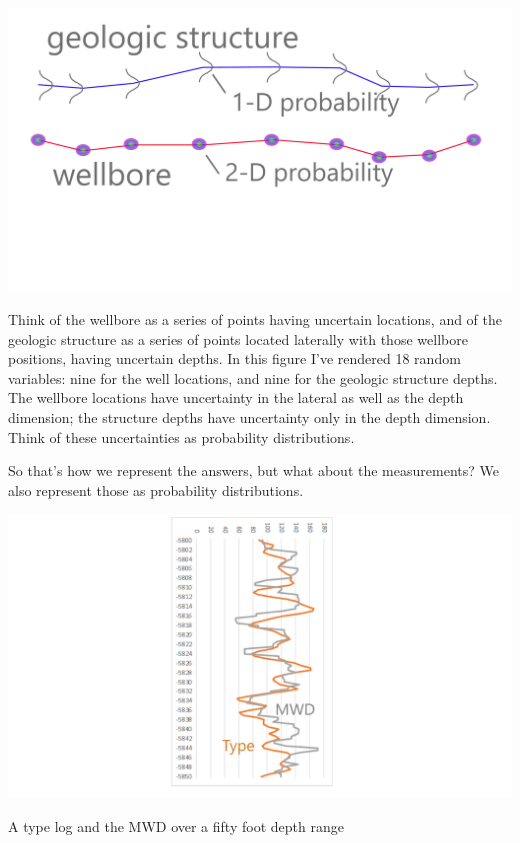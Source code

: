 \documentclass{tufte-handout}
\begin{document}
\begin{marginfigure}
  \includegraphics{random-vars-lateral}
  \caption{Think of the wellbore as a series of points having 
  uncertain locations, and of the geologic structure as a series
  of points located laterally with those wellbore positions, having uncertain depths. In this figure I've rendered 18 random variables: nine for the well locations, and nine for the geologic structure depths. The wellbore locations have uncertainty in the lateral as well as the depth dimension; the structure depths have uncertainty only in the depth dimension. Think of these uncertainties as probability distributions.}
  \label{fig:random-vars-lateral}
\end{marginfigure}

So that's how we represent the answers, but what about the measurements? We also represent those as probability distributions. 


\begin{marginfigure}
  \includegraphics{logfit}
  \caption{A type log and the MWD over a fifty foot depth range}
  \label{fig:logfit}
\end{marginfigure}
\end{document}
